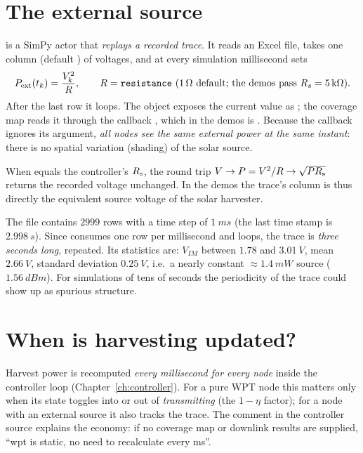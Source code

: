 \section{The external source}
\label{sec:envsource}

 is a SimPy actor that \emph{replays a recorded trace}.
It reads an Excel file, takes one column (default ) of voltages, and at
every simulation millisecond sets
\[
 P_{\mathrm{ext}}(t_k)=\frac{V_k^{2}}{R},\qquad R=\code{resistance}\ (\SI{1}{\ohm}\ \text{default; the demos pass }R_s=\SI{5}{k\ohm}).
\]
After the last row it loops. The object exposes the current value as
; the coverage map reads it through the callback
, which in the demos is
. Because the callback ignores its
argument, \emph{all nodes see the same external power at the same instant}: there is no
spatial variation (shading) of the solar source.

When  equals the controller's $R_{\mathrm{s}}$, the round trip
$V\to P=V^2/R\to\sqrt{PR_{\mathrm{s}}}$ returns the recorded voltage unchanged. In the demos the trace's 
column is thus directly the equivalent source voltage of the solar harvester.

\begin{reality}
The file  contains $2999$ rows with a time
step of $\SI{1}{ms}$ (the last time stamp is $\SI{2.998}{s}$). Since
 consumes one row per millisecond and loops, the
trace is \emph{three seconds long}, repeated. Its statistics are: $V_{IM}$ between
$1.78$ and $\SI{3.01}{V}$, mean $\SI{2.66}{V}$, standard deviation $\SI{0.25}{V}$, i.e.\ a
nearly constant $\approx\SI{1.4}{mW}$ source ($\SI{1.56}{dBm}$). For simulations of tens of
seconds the periodicity of the trace could show up as spurious structure.
\end{reality}

\section{When is harvesting updated?}

Harvest power is recomputed \emph{every millisecond for every node} inside the
controller loop (Chapter~\ref{ch:controller}). For a pure WPT node this matters
only when its state toggles into or out of \emph{transmitting} (the $1-\eta$
factor); for a node with an external source it also tracks the trace. The comment
in the controller source explains the economy: if no coverage map or downlink
results are supplied, ``wpt is static, no need to recalculate every ms''.

